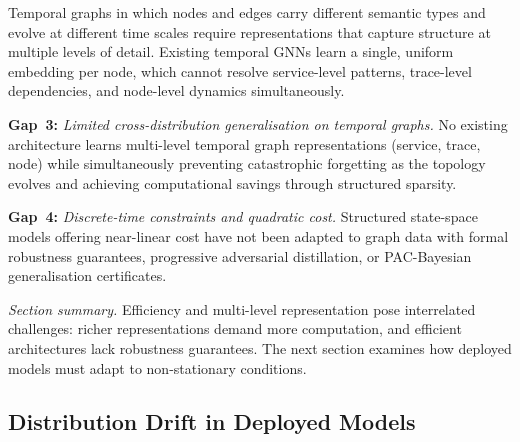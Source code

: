 Temporal graphs in which nodes and edges carry different semantic types and evolve at different time scales require representations that capture structure at multiple levels of detail. Existing temporal GNNs learn a single, uniform embedding per node, which cannot resolve service-level patterns, trace-level dependencies, and node-level dynamics simultaneously.

\noindent\textbf{Gap~3:} \emph{Limited cross-distribution generalisation on temporal graphs.} No existing architecture learns multi-level temporal graph representations (service, trace, node) while simultaneously preventing catastrophic forgetting as the topology evolves and achieving computational savings through structured sparsity.

\medskip
\noindent\textbf{Gap~4:} \emph{Discrete-time constraints and quadratic cost.} Structured state-space models offering near-linear cost have not been adapted to graph data with formal robustness guarantees, progressive adversarial distillation, or PAC-Bayesian generalisation certificates.

\medskip
\noindent\textit{Section summary.} Efficiency and multi-level representation pose interrelated challenges: richer representations demand more computation, and efficient architectures lack robustness guarantees. The next section examines how deployed models must adapt to non-stationary conditions.

\label{sec:nonstationarity}%

\subsection{Distribution Drift in Deployed Models}

